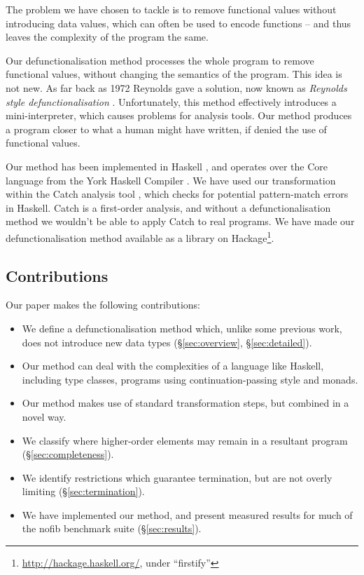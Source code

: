 \documentclass[preprint]{sigplanconf}
\begin{document}
The problem we have chosen to tackle is to remove functional values without introducing data values, which can often be used to encode functions -- and thus leaves the complexity of the program the same.

Our defunctionalisation method processes the whole program to remove functional values, without changing the semantics of the program. This idea is not new. As far back as 1972 Reynolds gave a solution, now known as \textit{Reynolds style defunctionalisation} \cite{reynolds:defunc}. Unfortunately, this method effectively introduces a mini-interpreter, which causes problems for analysis tools. Our method produces a program closer to what a human might have written, if denied the use of functional values.

Our method has been implemented in Haskell \cite{haskell}, and operates over the Core language from the York Haskell Compiler \cite{me:yhc_core}. We have used our transformation within the Catch analysis tool \cite{me:catch}, which checks for potential pattern-match errors in Haskell. Catch is a first-order analysis, and without a defunctionalisation method we wouldn't be able to apply Catch to real programs. We have made our defunctionalisation method available as a library on Hackage\footnote{\url{http://hackage.haskell.org/}, under ``firstify''}.

\subsection{Contributions}

Our paper makes the following contributions:

\begin{itemize}
\item We define a defunctionalisation method which, unlike some previous work, does not introduce new data types (\S\ref{sec:overview}, \S\ref{sec:detailed}).
\item Our method can deal with the complexities of a language like Haskell, including type classes, programs using continuation-passing style and monads.
\item Our method makes use of standard transformation steps, but combined in a novel way.
\item We classify where higher-order elements may remain in a resultant program (\S\ref{sec:completeness}).
\item We identify restrictions which guarantee termination, but are not overly limiting (\S\ref{sec:termination}).
\item We have implemented our method, and present measured results for much of the nofib benchmark suite (\S\ref{sec:results}).
\end{itemize}
\end{document}
